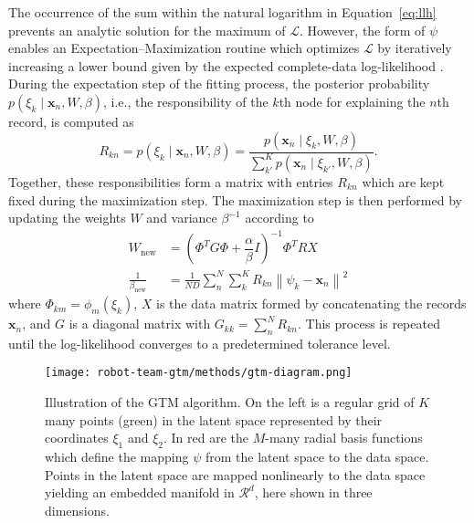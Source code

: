 The occurrence of the sum within the natural logarithm in Equation~\eqref{eq:llh} prevents an analytic solution for the maximum of $\mathcal{L}$. However, the form of $\psi$ enables an Expectation--Maximization routine which optimizes $\mathcal{L}$ by iteratively increasing a lower bound given by the expected complete-data log-likelihood \cite{em-algorithm}. %
During the expectation step of the fitting process, the posterior probability $p(\xi_k \mid \mathbf{x}_n, W, \beta)$, i.e., the responsibility of the $k$th node for explaining the $n$th record, is computed as 
\begin{equation}\label{eq:responsibility}
    R_{kn} = p(\xi_k \mid \mathbf{x}_n, W, \beta) = \dfrac{p(\mathbf{x}_n \mid \xi_k, W, \beta)}{\sum\limits_{k'}^{K} p(\mathbf{x}_n \mid \xi_{k'}, W, \beta)}.
\end{equation}
Together, these responsibilities form a matrix with entries $R_{kn}$ which are kept fixed during the maximization step. The maximization step is then performed by updating the weights $W$ and variance $\beta^{-1}$ according to
\begin{align}\label{eq:m-step}
    W_{\text{new}} &= \left(\Phi^T G \Phi + \dfrac{\alpha}{\beta}I \right)^{-1} \Phi^T R X  \\
    \frac{1}{\beta_{\text{new}}} &= \frac{1}{ND} \sum\limits_{n}^{N} \sum\limits_{k}^{K} R_{kn} \left\lVert \psi_k - \mathbf{x}_n \right\rVert^2
\end{align}
where $\Phi_{km} = \phi_m(\xi_k)$, $X$ is the data matrix formed by concatenating the records $\mathbf{x}_n$, and $G$ is a diagonal matrix with $G_{kk} = \sum\limits_n^N R_{kn}$. This process is repeated until the log-likelihood converges to a predetermined tolerance level.

\begin{figure}[H]
  \centering
  \texttt{[image: robot-team-gtm/methods/gtm-diagram.png]}
  \caption{Illustration of the GTM algorithm. On the left is a regular grid of
    $K$ many points (green) in the latent space represented by their coordinates
    $\xi_1$ and $\xi_2$. In red are the $M$-many radial basis functions which
    define the mapping $\psi$ from the latent space to the data space. Points in
    the latent space are mapped nonlinearly to the data space yielding an
    embedded manifold in $\mathcal{R}^d$, here shown in three dimensions.}
  \label{fig:gtm-diagram}
\end{figure}



